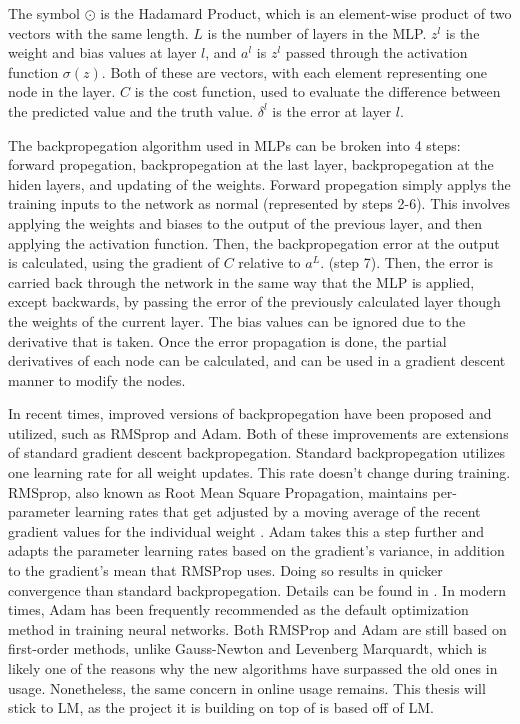 	\par The symbol $\odot$ is the Hadamard Product, which is an element-wise product of two vectors with the same length. $L$ is the number of layers in the MLP. $z^l$ is the weight and bias values at layer $l$, and $a^l$ is $z^l$ passed through the activation function $\sigma(z)$. Both of these are vectors, with each element representing one node in the layer. $C$ is the cost function, used to evaluate the difference between the predicted value and the truth value. $\delta^l$ is the error at layer $l$.
	\par The backpropegation algorithm used in MLPs can be broken into 4 steps: forward propegation, backpropegation at the last layer, backpropegation at the hiden layers, and updating of the weights. 
	Forward propegation simply applys the training inputs to the network as normal (represented by steps 2-6). This involves applying the weights and biases to the output of the previous layer, and then applying the activation function. Then, the backpropegation error at the output is calculated, using the gradient of $C$ relative to $a^L$. (step 7). Then, the error is carried back through the network in the same way that the MLP is applied, except backwards, by passing the error of the previously calculated layer though the weights of the current layer. The bias values can be ignored due to the derivative that is taken. Once the error propagation is done, the partial derivatives of each node can be calculated, and can be used in a gradient descent manner to modify the nodes. 
	\par In recent times, improved versions of backpropegation have been proposed and utilized, such as RMSprop and Adam. Both of these improvements are extensions of standard gradient descent backpropegation. Standard backpropegation utilizes one learning rate for all weight updates. This rate doesn't change during training. RMSprop, also known as Root Mean Square Propagation, maintains per-parameter learning rates that get adjusted by a moving average of the recent gradient values for the individual weight \cite{RMSPropPaper}. Adam takes this a step further and adapts the parameter learning rates based on the gradient's variance, in addition to the gradient's mean that RMSProp uses. Doing so results in quicker convergence than standard backpropegation. Details can be found in \cite{AdamPaper}. In modern times, Adam has been frequently recommended as the default optimization method in training neural networks\cite{CNNKarpathyClass}. Both RMSProp and Adam are still based on first-order methods, unlike Gauss-Newton and Levenberg Marquardt, which is likely one of the reasons why the new algorithms have surpassed the old ones in usage. Nonetheless, the same concern in online usage remains. This thesis will stick to LM, as the project it is building on top of is based off of LM.
